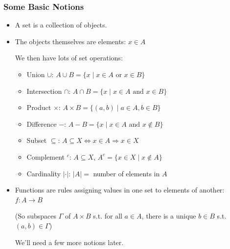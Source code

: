 \documentclass[aspectratio=169,xcolor=dvipsnames,svgnames,x11names,fleqn]{beamer}
\begin{document}
\begin{frame}
\frametitle{Some Basic Notions}
\begin{itemize}
    \item A \textcolor{androidRed}{set} is a collection of objects.
    \item The objects themselves are \textcolor{androidRed}{elements}: $x \in A$
    
    \medskip
    We then have lots of set operations:
    \begin{itemize}
        \item \textcolor{androidRed}{Union} $\cup$: $A \cup B = \{x \mid x \in A \text{ or } x \in B\}$
        \item \textcolor{androidRed}{Intersection} $\cap$: $A \cap B = \{x \mid x \in A \text{ and } x \in B\}$
        \item \textcolor{androidRed}{Product} $\times$: $A \times B = \{(a,b) \mid a \in A, b \in B\}$
        \item \textcolor{androidRed}{Difference} $-$: $A - B = \{x \mid x \in A \text{ and } x \notin B\}$
        \item \textcolor{androidRed}{Subset} $\subseteq$: $A \subseteq X \Leftrightarrow x \in A \Rightarrow x \in X$
        \item \textcolor{androidRed}{Complement} ${}^c$: $A \subseteq X$, $A^c = \{x \in X \mid x \notin A\}$
        \item \textcolor{androidRed}{Cardinality} $|\cdot|$: $|A|=$ number of elements in $A$
    \end{itemize}
    
    \medskip
    \item \textcolor{androidRed}{Functions} are rules assigning values in one set to elements of another: $f: A \to B$
    
    (So subspaces $\Gamma$ of $A \times B$ s.t. for all $a \in A$, there is a unique $b \in B$ s.t. $(a,b) \in \Gamma$)
    
    \medskip
    We'll need a few more notions later.
\end{itemize}
\end{frame}
\end{document}
